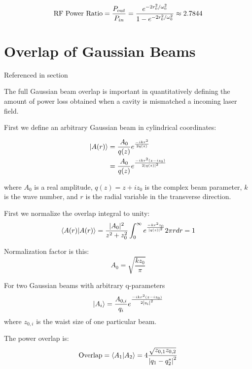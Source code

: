 \documentclass[oneside]{book}
\begin{document}
\begin{appendices}
	\begin{equation}
	\text{RF Power Ratio} 
	= \frac{P_{out}}{P_{in}} \\
	= \frac{e^{-2r_0^2/ \omega_{0}^2}} {1 - e^{-2r_0^2/ \omega_{0}^2 }} \approx 2.7844
	\end{equation}
	
	\chapter{Overlap of Gaussian Beams}
	
	Referenced in section
	
	The full Gaussian beam overlap is important in quantitatively defining the amount of power loss obtained when a cavity is mismatched a incoming laser field.
	
	First we define an arbitrary Gaussian beam in cylindrical coordinates:
	
	\begin{equation}
	\begin{split}
	\ket{A(r)} 
	&= \frac{A_0}{q(z)} e^{\frac{-ikr^2}{2q(z)}}\\
	&= \frac{A_0}{q(z)} e^{\frac{-ikr^2(z-iz_0)}{2\abs{q(z)}^2}}
	\end{split}
	\end{equation}
	
	where $A_0$ is a real amplitude, $q(z)= z + i z_0$ is the complex beam parameter, $k$ is the wave number, and $r$ is the radial variable in the transverse direction.

	First we normalize the overlap integral to unity:
	\begin{equation}
	\braket{A(r)|A(r)} 
	=  \frac{\rvert A_0 \rvert^2}{z^2+z_0^2} \int_{0}^{\infty} e^{\frac{-kr^2 z_0}{\abs{q(z)}^2}} 2 \pi r dr = 1
	\end{equation}

	Normalization factor is this:
	\begin{equation}
	A_0 = \sqrt{\frac{k z_0}{\pi}}
	\end{equation}

	For two Gaussian beams with arbitrary q-parameters
	\begin{equation}
	\ket{A_i} = \frac{A_{0,i}}{q_i} e^{ \frac{-ikr^2(z-iz_0)}{2\abs{q_i}^2 }}
	\end{equation}
	where $z_{0,i}$ is the waist size of one particular beam.
	
	The power overlap is:
	\begin{equation}
	\text{Overlap} = \braket{A_1|A_2} = 4 \frac{ \sqrt{z_{0,1}z_{0,2}}}{\abs{q_1 - q_2^*}^2}
	\end{equation}

\end{appendices} 

\medskip



\end{document}

